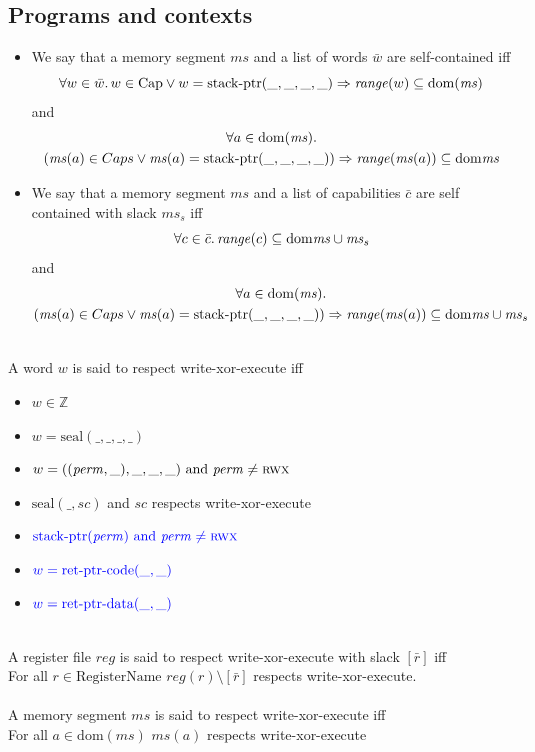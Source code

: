 \documentclass[a3paper]{article}
\newcommand{\dom}{\mathrm{dom}}
\newcommand{\tand}{\text{ and }}
\newcommand{\sourcecolor}{\color{blue}}
\newcommand{\src}[1]{{\sourcecolor #1}}
\newcommand{\ints}{\mathbb{Z}}
\newcommand{\shareddom}[1]{\mathrm{#1}}
\newcommand{\RegName}{\shareddom{RegisterName}}
\newcommand{\Caps}{\shareddom{Cap}}
\newcommand{\perm}{\var{perm}}
\newcommand{\stkptr}[1]{\mathrm{stack\text{-}ptr}(#1)}
\newcommand{\retptrd}{\mathrm{ret\text{-}ptr\text{-}data}}
\newcommand{\retptrc}{\mathrm{ret\text{-}ptr\text{-}code}}
\newcommand{\seal}[1]{\shareddom{seal}(#1)}
\newcommand{\var}[1]{\mathit{#1}}
\newcommand{\reg}{\var{reg}}
\newcommand{\ms}{\var{ms}}
\newcommand{\vsc}{\var{sc}}
\newcommand{\aaddr}{\var{a}}
\newcommand{\plainperm}[1]{\textsc{#1}}
\newcommand{\rwx}{\plainperm{rwx}}
\newcommand{\plainfun}[2]{
  \ifthenelse{\equal{#2}{}}
  {\mathit{#1}}
  {\mathit{#1}(#2)}
}
\newcommand{\range}[1]{\plainfun{range}{#1}}
\begin{document}
\subsection{Programs and contexts}
\begin{definition}
  \label{def:self-contained}
  \begin{itemize}
  \item We say that a memory segment $\ms$ and a list of words $\bar{w}$
    are self-contained iff
  \[
    \forall w \in \bar{w} \ldotp w \in \Caps \lor w = \stkptr{\_,\_,\_,\_} \Rightarrow \range{w} \subseteq \dom(\ms)
  \]
  and
  \begin{multline*}
    \forall a \in \dom(\ms) \ldotp\\
    (\ms(a) \in Caps \lor \ms(a) = \stkptr{\_,\_,\_,\_}) \Rightarrow \range{\ms(a)} \subseteq \dom{\ms}
  \end{multline*}
  \item We say that a memory segment $\ms$ and a list of capabilities $\bar{c}$ are self contained with slack $\ms_s$ iff
  \[
    \forall c \in \bar{c} \ldotp \range{c} \subseteq \dom{\ms \cup \ms_s}
  \]
  and
  \begin{multline*}
    \forall a \in \dom(\ms) \ldotp\\
    (\ms(a) \in Caps \lor \ms(a) = \stkptr{\_,\_,\_,\_}) \Rightarrow \range{\ms(a)} \subseteq \dom{\ms \cup \ms_s}
  \end{multline*}
\end{itemize}
\end{definition}

\begin{definition}
  \label{def:wxorx}
  ~\\
  A word $w$ is said to respect write-xor-execute iff
  \begin{itemize}
  \item $w \in \ints$
  \item $w = \seal{\_,\_,\_,\_}$
  \item $w = ((\perm,\_),\_,\_,\_) \tand \perm \neq \rwx$
  \item $\seal{\_,\vsc}$ and $\vsc$ respects write-xor-execute
  \item $\src{\stkptr{\perm} \tand \perm \neq \rwx}$
  \item $\src{w = \retptrc(\_,\_)}$
  \item $\src{w = \retptrd(\_,\_)}$
  \end{itemize}
~\\
  A register file $\reg$ is said to respect write-xor-execute with slack $[\bar{r}]$ iff \\
  For all $r \in \RegName$ $\reg(r) \setminus [\bar{r}]$ respects write-xor-execute.
~\\
~\\
  A memory segment $\ms$ is said to respect write-xor-execute iff\\
  For all $\aaddr \in \dom(\ms)$ $\ms(\aaddr)$ respects write-xor-execute
\end{definition}
\end{document}
